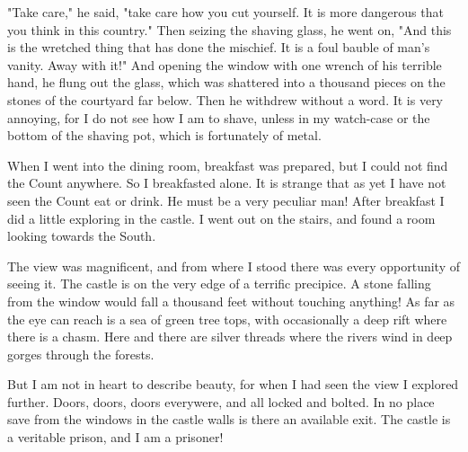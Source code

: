 "Take care," he said, "take care how you cut yourself. It is more dangerous that you think in this country." Then seizing the shaving glass, he went on, "And this is the wretched thing that has done the mischief. It is a foul bauble of man's vanity. Away with it!" And opening the window with one wrench of his terrible hand, he flung out the glass, which was shattered into a thousand pieces on the stones of the courtyard far below. Then he withdrew without a word. It is very annoying, for I do not see how I am to shave, unless in my watch-case or the bottom of the shaving pot, which is fortunately of metal. 

When I went into the dining room, breakfast was prepared, but I could not find the Count anywhere. So I breakfasted alone. It is strange that as yet I have not seen the Count eat or drink. He must be a very peculiar man! After breakfast I did a little exploring in the castle. I went out on the stairs, and found a room looking towards the South. 

The view was magnificent, and from where I stood there was every opportunity of seeing it. The castle is on the very edge of a terrific precipice. A stone falling from the window would fall a thousand feet without touching anything! As far as the eye can reach is a sea of green tree tops, with occasionally a deep rift where there is a chasm. Here and there are silver threads where the rivers wind in deep gorges through the forests. 

But I am not in heart to describe beauty, for when I had seen the view I explored further. Doors, doors, doors everywere, and all locked and bolted. In no place save from the windows in the castle walls is there an available exit. The castle is a veritable prison, and I am a prisoner! 
